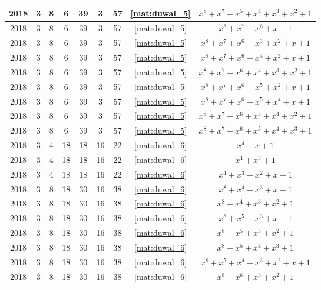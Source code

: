 \begin{longtable}{|c|c|c|c|c|c|c|c|c|}
2018 & 3 & 8 & 6 & 39 & 3 & 57 & \eqref{mat:duwal_5} & $x^8 + x^7 + x^5 + x^4 + x^3 + x^2 + 1$ \\ \hline 
2018 & 3 & 8 & 6 & 39 & 3 & 57 & \eqref{mat:duwal_5} & $x^8 + x^7 + x^6 + x + 1$ \\ \hline 
2018 & 3 & 8 & 6 & 39 & 3 & 57 & \eqref{mat:duwal_5} & $x^8 + x^7 + x^6 + x^3 + x^2 + x + 1$ \\ \hline 
2018 & 3 & 8 & 6 & 39 & 3 & 57 & \eqref{mat:duwal_5} & $x^8 + x^7 + x^6 + x^4 + x^2 + x + 1$ \\ \hline 
2018 & 3 & 8 & 6 & 39 & 3 & 57 & \eqref{mat:duwal_5} & $x^8 + x^7 + x^6 + x^4 + x^3 + x^2 + 1$ \\ \hline 
2018 & 3 & 8 & 6 & 39 & 3 & 57 & \eqref{mat:duwal_5} & $x^8 + x^7 + x^6 + x^5 + x^2 + x + 1$ \\ \hline 
2018 & 3 & 8 & 6 & 39 & 3 & 57 & \eqref{mat:duwal_5} & $x^8 + x^7 + x^6 + x^5 + x^4 + x + 1$ \\ \hline 
2018 & 3 & 8 & 6 & 39 & 3 & 57 & \eqref{mat:duwal_5} & $x^8 + x^7 + x^6 + x^5 + x^4 + x^2 + 1$ \\ \hline 
2018 & 3 & 8 & 6 & 39 & 3 & 57 & \eqref{mat:duwal_5} & $x^8 + x^7 + x^6 + x^5 + x^4 + x^3 + 1$ \\ \hline 
2018 & 3 & 4 & 18 & 18 & 16 & 22 & \eqref{mat:duwal_6} & $x^4 + x + 1$ \\ \hline 
2018 & 3 & 4 & 18 & 18 & 16 & 22 & \eqref{mat:duwal_6} & $x^4 + x^3 + 1$ \\ \hline 
2018 & 3 & 4 & 18 & 18 & 16 & 22 & \eqref{mat:duwal_6} & $x^4 + x^3 + x^2 + x + 1$ \\ \hline 
2018 & 3 & 8 & 18 & 30 & 16 & 38 & \eqref{mat:duwal_6} & $x^8 + x^4 + x^3 + x + 1$ \\ \hline 
2018 & 3 & 8 & 18 & 30 & 16 & 38 & \eqref{mat:duwal_6} & $x^8 + x^4 + x^3 + x^2 + 1$ \\ \hline 
2018 & 3 & 8 & 18 & 30 & 16 & 38 & \eqref{mat:duwal_6} & $x^8 + x^5 + x^3 + x + 1$ \\ \hline 
2018 & 3 & 8 & 18 & 30 & 16 & 38 & \eqref{mat:duwal_6} & $x^8 + x^5 + x^3 + x^2 + 1$ \\ \hline 
2018 & 3 & 8 & 18 & 30 & 16 & 38 & \eqref{mat:duwal_6} & $x^8 + x^5 + x^4 + x^3 + 1$ \\ \hline 
2018 & 3 & 8 & 18 & 30 & 16 & 38 & \eqref{mat:duwal_6} & $x^8 + x^5 + x^4 + x^3 + x^2 + x + 1$ \\ \hline 
2018 & 3 & 8 & 18 & 30 & 16 & 38 & \eqref{mat:duwal_6} & $x^8 + x^6 + x^3 + x^2 + 1$ \\ \hline 

\end{longtable}
